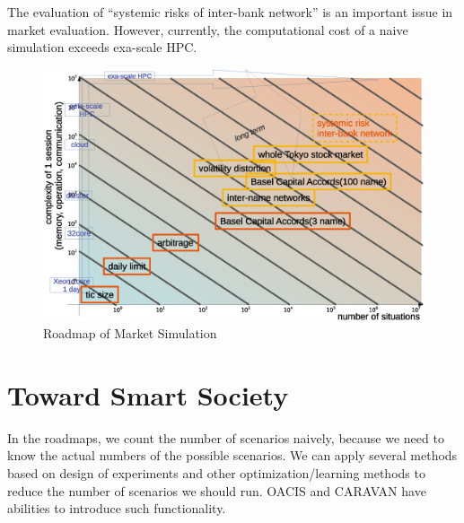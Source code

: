 The evaluation of ``systemic risks of inter-bank network'' is an important issue
in market evaluation.
However, currently, the 
computational cost of a naive simulation exceeds exa-scale HPC.


\begin{figure}
  \centering
  \includegraphics[width=.60\linewidth]{Figs.noda/figure2-6.eps}
  \caption{Roadmap of Market Simulation}
  \label{fig:Figure-6}
\end{figure}




\section{Toward Smart Society}

In the roadmaps, we count the number of scenarios naively,
because we need to know the actual numbers of the possible scenarios.
We can apply several methods based on design of experiments
and other optimization/learning methods to reduce the number of scenarios
we should run.
OACIS and CARAVAN have abilities to introduce such functionality. 

